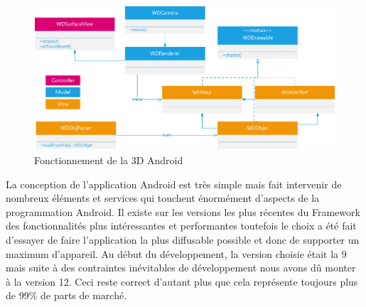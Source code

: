 \begin{figure}[H]
    \centering
    \includegraphics[width=\textwidth]{./img/android-3d.png}
    \caption{Fonctionnement de la 3D Android}
    \label{3d}
\end{figure}

La conception de l’application Android est très simple mais fait intervenir de nombreux éléments et services qui touchent énormément d’aspects de la programmation Android. Il existe sur les versions les plus récentes du Framework des fonctionnalités plus intéressantes et performantes toutefois le choix a été fait d’essayer de faire l’application la plus diffusable possible et donc de supporter un maximum d’appareil. Au début du développement, la version choisie était la 9 mais suite à des contraintes inévitables de développement nous avons dû monter à la version 12. Ceci reste correct d’autant plus que cela représente toujours plus de 99\% de parts de marché.